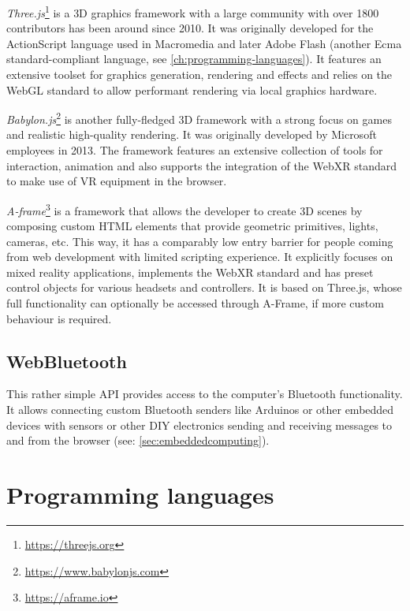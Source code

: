 

\emph{Three.js}\footnote{\url{https://threejs.org}} is a \ac{3D} graphics framework with a large community with over 1800 contributors has been around since 2010.
It was originally developed for the ActionScript language used in Macromedia and later Adobe Flash (another Ecma standard-compliant language, see \autoref{ch:programming-languages}). It features an extensive toolset for graphics generation, rendering and effects and relies on the WebGL standard to allow performant rendering via local graphics hardware.

\emph{Babylon.js}\footnote{\url{https://www.babylonjs.com}} is another fully-fledged \ac{3D} framework with a strong focus on games and realistic high-quality rendering.
It was originally developed by Microsoft employees in 2013.
The framework features an extensive collection of tools for interaction, animation and also supports the integration of the \ac{WebXR} standard to make use of \ac{VR} equipment in the browser.

\emph{A-frame}\footnote{\url{https://aframe.io}} is a framework that allows the developer to create \ac{3D} scenes by composing custom HTML elements that provide geometric primitives, lights, cameras, etc.
This way, it has a comparably low entry barrier for people coming from web development with limited scripting experience.
It explicitly focuses on mixed reality applications, implements the WebXR standard and has preset control objects for various headsets and controllers.
It is based on Three.js, whose full functionality can optionally be accessed through A-Frame, if more custom behaviour is required.

\subsection{WebBluetooth}

This rather simple \ac{API} provides access to the computer's Bluetooth functionality.
It allows connecting custom Bluetooth senders like Arduinos or other embedded devices with sensors or other \ac{DIY} electronics sending and receiving messages to and from the browser (see: \autoref{sec:embeddedcomputing}).

\section{Programming languages}
\label{sec:programming-languages}

